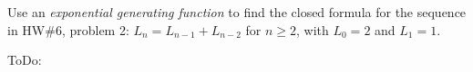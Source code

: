 Use an \textit{exponential generating function} to find the closed formula for the sequence in HW\#6, problem 2: $L_n = L_{n-1}+L_{n-2}$ for $n\ge2$, with $L_0=2$ and $L_1=1$.
\begin{framed}
	ToDo:
\end{framed}